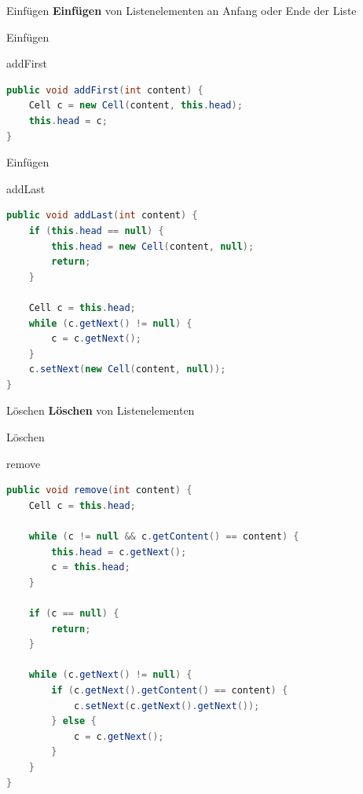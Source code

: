 \documentclass[18pt]{beamer}
\begin{document}
\begin{frame}{Einfügen}
    \textbf{Einfügen} von Listenelementen an Anfang oder Ende der Liste
\end{frame}


\begin{frame}[fragile]{Einfügen}
    \begin{exampleblock}{addFirst}
        \begin{lstlisting}[language=Java,basicstyle=\scriptsize]
public void addFirst(int content) {
    Cell c = new Cell(content, this.head);
    this.head = c;
}
        \end{lstlisting}

    \end{exampleblock}

\end{frame}

\begin{frame}[fragile]{Einfügen}

    \begin{exampleblock}{addLast}
        \begin{lstlisting}[language=Java,basicstyle=\scriptsize]
public void addLast(int content) {
    if (this.head == null) {
        this.head = new Cell(content, null);
        return;
    }

    Cell c = this.head;
    while (c.getNext() != null) {
        c = c.getNext();
    }
    c.setNext(new Cell(content, null));
}
        \end{lstlisting}

    \end{exampleblock}

\end{frame}

\begin{frame}{Löschen}
    \textbf{Löschen} von Listenelementen
\end{frame}

\begin{frame}[fragile]{Löschen}
    \begin{exampleblock}{remove}
        \begin{lstlisting}[language=Java,basicstyle=\scriptsize]
public void remove(int content) {
    Cell c = this.head;

    while (c != null && c.getContent() == content) {
        this.head = c.getNext();
        c = this.head;
    }

    if (c == null) {
        return;
    }

    while (c.getNext() != null) {
        if (c.getNext().getContent() == content) {
            c.setNext(c.getNext().getNext());
        } else {
            c = c.getNext();
        }
    }
}
        \end{lstlisting}

    \end{exampleblock}

\end{frame}
\end{document}
